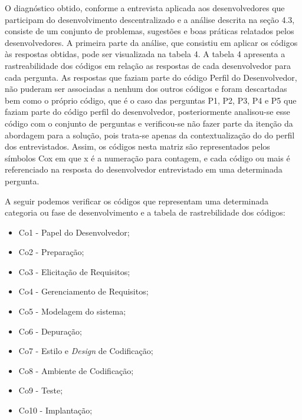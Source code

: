 O diagnóstico obtido, conforme a entrevista aplicada aos desenvolvedores que participam do desenvolvimento descentralizado e a análise descrita na seção 4.3, consiste de um conjunto de problemas, sugestões e boas práticas relatados pelos desenvolvedores. A primeira parte da análise, que consistiu em aplicar os códigos às respostas obtidas, pode ser visualizada na tabela 4. A tabela 4 apresenta a rastreabilidade dos códigos em relação as respostas de cada desenvolvedor para cada pergunta. As respostas que faziam parte do código Perfil do Desenvolvedor, não puderam ser associadas a nenhum dos outros códigos e foram descartadas bem como o próprio código, que é o caso das perguntas P1, P2, P3, P4 e P5 que faziam parte do código perfil do desenvolvedor, posteriormente analisou-se esse código com o conjunto de perguntas e verificou-se não fazer parte da itenção da abordagem para a solução, pois trata-se apenas da contextualização do do perfil dos entrevistados. Assim, os códigos nesta matriz são representados pelos símbolos Cox em que x é a numeração para contagem, e cada código ou mais é referenciado na resposta do desenvolvedor entrevistado em uma determinada pergunta.

A seguir podemos verificar os códigos que representam uma determinada categoria ou fase de desenvolvimento e a tabela de rastrebilidade dos códigos:

\begin{itemize}
\item Co1 - Papel do Desenvolvedor;
\item Co2 - Preparação;
\item Co3 - Elicitação de Requisitos;
\item Co4 - Gerenciamento de Requisitos;
\item Co5 - Modelagem do sistema;
\item Co6 - Depuração;
\item Co7 - Estilo e \textit{Design} de Codificação;
\item Co8 - Ambiente de Codificação;
\item Co9 - Teste;
\item Co10 - Implantação;
\end{itemize}

